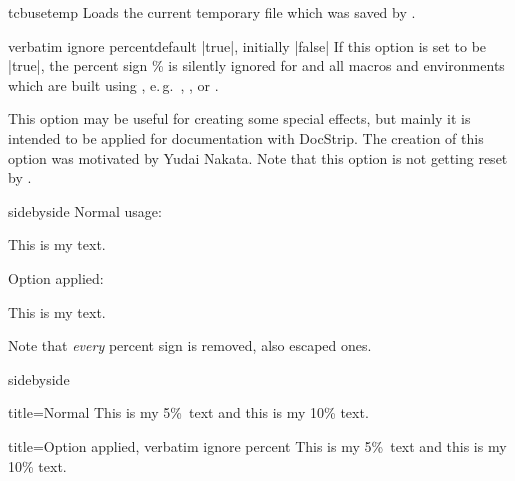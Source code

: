 \begin{docCommand}{tcbusetemp}{}
  Loads the current temporary file which was saved by .
\end{docCommand}

\clearpage

\begin{docTcbKey}[][doc new=2017-07-05]{verbatim ignore percent}{}{default |true|, initially |false|}
  If this option is set to be |true|, the percent sign \% is silently
  ignored for  and all macros and environments
  which are built using , e.\,g.\ 
  , , or .\par
  This option may be useful for creating some special effects, but mainly
  it is intended to be applied for documentation with DocStrip.
  The creation of this option was motivated by Yudai Nakata.
  Note that this option is not getting reset by .
\begin{dispExample*}{sidebyside}
Normal usage:
\begin{tcbwritetemp}
This is my text.
\end{tcbwritetemp}

\tcbusetemp

\bigskip Option applied:
\begin{tcbwritetemp}
This is my text.
\end{tcbwritetemp}

\tcbusetemp
\end{dispExample*}

\begin{marker}
Note that \emph{every} percent sign is removed, also escaped ones.
\end{marker}

\begin{dispExample*}{sidebyside}
\def\percent{\%}

\begin{tcblisting}{title=Normal}
This is my 5\percent\ text
and this is my 10\% text.
\end{tcblisting}

\begin{tcblisting}{
  title=Option applied,
  verbatim ignore percent}
This is my 5\percent\ text
and this is my 10\% text.
\end{tcblisting}
\end{dispExample*}

\end{docTcbKey}

